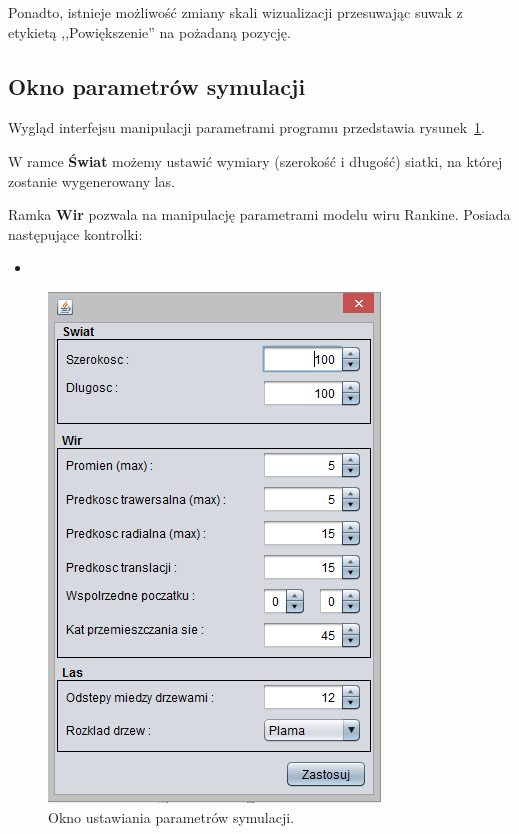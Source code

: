 Ponadto, istnieje możliwość zmiany skali wizualizacji przesuwając suwak z etykietą ,,Powiększenie'' na pożadaną pozycję.



\subsection{Okno parametrów symulacji}

Wygląd interfejsu manipulacji parametrami programu przedstawia rysunek~\ref{fig:gui_param}.

W ramce \textbf{Świat} możemy ustawić wymiary (szerokość i długość) siatki, na której zostanie wygenerowany las.

Ramka \textbf{Wir} pozwala na manipulację parametrami modelu wiru Rankine. Posiada następujące kontrolki:
\begin{itemize}
\item
\end{itemize}

\begin{figure}[!h]
	\center
	\includegraphics[scale=1]{gui_param}
	\caption{Okno ustawiania parametrów symulacji.}
	\label{fig:gui_param}
\end{figure} 